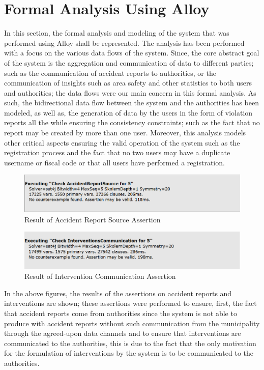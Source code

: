 \section{Formal Analysis Using Alloy}
In this section, the formal analysis and modeling of the system that was performed using Alloy shall be represented. The analysis has been performed with a focus on the various data flows of the system. Since, the core abstract goal of the system is the aggregation and communication of data to different parties; such as the communication of accident reports to authorities, or the communication of insights such as area safety and other statistics to both users and authorities; the data flows were our main concern in this formal analysis. As such, the bidirectional data flow between the system and the authorities has been modeled, as well as, the generation of data by the users in the form of violation reports all the while ensuring the consistency constraints; such as the fact that no report may be created by more than one user. Moreover, this analysis models other critical aspects ensuring the valid operation of the system such as the registration process and the fact that no two users may have a duplicate username or fiscal code or that all users have performed a registration.

	
	
	\begin{figure}[H]	
		\centering
		\includegraphics[scale=0.35]{images/ReportSourceAssertion.png}
		\caption{Result of Accident Report Source Assertion}
	\end{figure}
	
	\begin{figure}[H]	
		\centering
		\includegraphics[scale=0.35]{images/InterventionCommAssertion.png}
		\caption{Result of Intervention Communication Assertion}
	\end{figure}	
		
In the above figures, the results of the assertions on accident reports and interventions are shown; these assertions were performed to ensure, first, the fact that accident reports come from authorities since the system is not able to produce with accident reports without such communication from the municipality through the agreed-upon data channels and to ensure that interventions are communicated to the authorities, this is due to the fact that the only motivation for the formulation of interventions by the system is to be communicated to the authorities.
	
